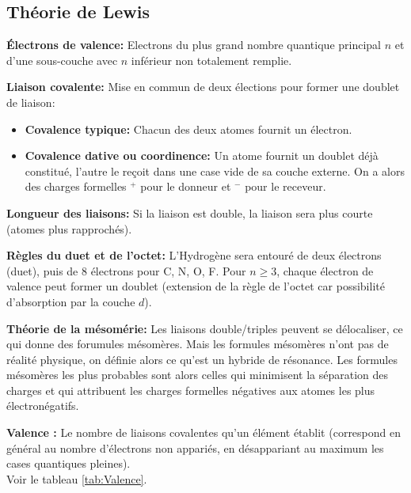 \documentclass{article}
\begin{document}
\subsection{Théorie de Lewis}

\noindent\textbf{Électrons de valence:} Electrons du plus grand nombre quantique principal $n$ et d'une sous-couche avec $n$ inférieur non totalement remplie.

\noindent\textbf{Liaison covalente:} Mise en commun de deux élections pour former une doublet de liaison:
\begin{itemize}[label=$\ast$]
    \item \textbf{Covalence typique:} Chacun des deux atomes fournit un électron.
    \item \textbf{Covalence dative ou coordinence:} Un atome fournit un doublet déjà constitué, l'autre le reçoit dans une case vide de sa couche externe.
    On a alors des charges formelles $^+$ pour le donneur et $^-$ pour le receveur.
\end{itemize}

\noindent\textbf{Longueur des liaisons:} Si la liaison est double, la liaison sera plus courte (atomes plus rapprochés).

\noindent\textbf{Règles du duet et de l'octet:} L'Hydrogène sera entouré de deux électrons (duet), puis de 8 électrons pour C, N, O, F.
Pour $n \ge 3$, chaque électron de valence peut former un doublet (extension de la règle de l'octet car possibilité d'absorption par la couche $d$).

\noindent\textbf{Théorie de la mésomérie:} Les liaisons double/triples peuvent se délocaliser, ce qui donne des forumules mésomères.
Mais les formules mésomères n'ont pas de réalité physique, on définie alors ce qu'est un hybride de résonance.
Les formules mésomères les plus probables sont alors celles qui minimisent la séparation des charges et qui attribuent les charges formelles négatives aux atomes les plus électronégatifs.

\noindent\textbf{Valence :} Le nombre de liaisons covalentes qu'un élément établit (correspond en général au nombre d'électrons non appariés, en désappariant au maximum les cases quantiques pleines).\\
Voir le tableau \ref{tab:Valence}. 
\end{document}

